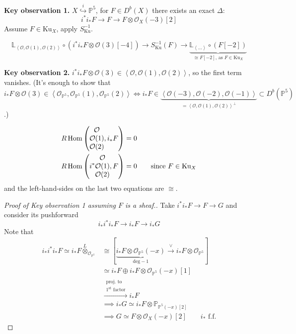 \medskip\noindent
{\bf Key observation 1.} 
$X\overset{i}{\hookrightarrow}\mathbb{P}^5$, for $F \in D^b(X)$
there exists an exact $\Delta$:
$$
i^*i_*F \to F \to F \otimes \mathcal{O}_X(-3)[2]
$$
Assume $F \in \text{Ku}_X$, apply $S^{-1}_{\text{Ku}}$.

$$
\mathbb{L}_{\left<\mathcal{O},\mathcal{O}(1),\mathcal{O}(2)\right>}
\circ (i^* i_* F \otimes \mathcal{O}(3)[-4]) \to S_{\text{Ku}}^{-1}(F)
\to \underbrace{\mathbb{L}_{\left<\ldots\right>}\circ(F[-2])}
_{\cong F[-2]\text{, as }F\in \text{Ku}_X}
$$

\medskip\noindent
{\bf Key observation 2.} $i^*i_*F \otimes \mathcal{O}(3) \in 
\left<\mathcal{O},\mathcal{O}(1),\mathcal{O}(2)\right>$, so the first term
vanishes. (It's enough to show that $i_*F \otimes \mathcal{O}(3) \in
\left<\mathcal{O}_{\mathbb{P}^5},\mathcal{O}_{\mathbb{P}^5}(1),
\mathcal{O}_{\mathbb{P}^5}(2)\right> 
\iff i_*F \in 
\underbrace{\left<\mathcal{O}(-3),\mathcal{O}(-2),\mathcal{O}(-1)\right>}
_{=\left<\mathcal{O},\mathcal{O}(1),\mathcal{O}(2)\right>^\perp} \subset 
D^b(\mathbb{P}^5)$.)

\begin{align*}
R\mathop{\mathrm{Hom}}\nolimits\left(
\begin{matrix}
\mathcal{O}\\ \mathcal{O}(1)\\ \mathcal{O}(2)
\end{matrix},i_*F
\right)&=0
\\
R\mathop{\mathrm{Hom}}\nolimits\left(
i^*\begin{matrix}
\mathcal{O}\\ \mathcal{O}(1)\\ \mathcal{O}(2)
\end{matrix},F
\right)&=0\qquad \text{since $F \in \text{Ku}_X$}
\end{align*}
and the left-hand-sides on the last two equations are $\cong$.

\begin{proof}[Proof of Key observation 1 assuming $F$ is a sheaf.]
Take $i^*i_*F \to F \to G$ and consider its pushforward
$$
i_*i^*i_*F \to i_* F \to i_*G
$$
Note that
\begin{align*}
i_*i^*i_*F \simeq i_*F\overset{L}{\otimes}_{\mathcal{O}_{\mathbb{P}^5}}
&\cong \left[ 
\underbrace{i_* F \otimes\mathcal{O}
_{\mathbb{P}^5}(-x)}_{\text{deg}-1} \xrightarrow{\vee}
i_*F\otimes \mathcal{O}_{\mathbb{P}^5}\right] \\
&  \simeq i_*F \oplus i_*F\otimes \mathcal{O}_{\mathbb{P}^5}(-x)[1]\\
&\xrightarrow{\substack{ \text{proj. to}\\\text{$1^{\text{st}}$ factor}}}i_*F\\
&  \implies i_*G \simeq i_* F \otimes \mathbb{P}_{\mathbb{P}^5(-x)[2]}\\
& \implies G \simeq F \otimes \mathcal{O}_X(-x)[2]\qquad i_*\text{ f.f.}
\end{align*}

\end{proof}


